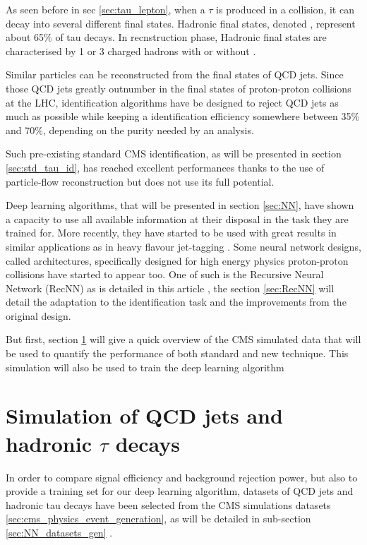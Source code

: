 
As seen before in sec \ref{sec:tau_lepton}, when a $\tau$ is produced in a collision, it can decay into several different final states.
Hadronic final states, denoted \tauh, represent about 65\% of tau decays.
In recnstruction phase, Hadronic final states are characterised by 1 or 3 charged hadrons with or without \pizero .

Similar particles can be reconstructed from the final states of QCD jets.
Since those QCD jets greatly outnumber \tauh in the final states of proton-proton collisions at the LHC, \tauh identification algorithms have be designed to reject QCD jets as much as possible while keeping a \tauh identification efficiency somewhere between 35\% and 70\%, depending on the purity needed by an analysis.

Such pre-existing standard CMS identification, as will be presented in section \ref{sec:std_tau_id}, has reached excellent performances thanks to the use of particle-flow reconstruction but does not use its full potential.

Deep learning algorithms, that will be presented in section \ref{sec:NN}, have shown a capacity to use all available information at their disposal in the task they are trained for. More recently, they have started to be used with great results in similar applications as in heavy flavour jet-tagging \cite{btagging_NN}. Some neural network designs, called architectures, specifically designed for high energy physics proton-proton collisions have started to appear too. One of such is the Recursive Neural Network (RecNN) as is detailed in this article \cite{qcd_aware_RecNN}, the section \ref{sec:RecNN} will detail the adaptation to the \tauh identification task and the improvements from the original design.

But first, section \ref{sec:NN_datasets} will give a quick overview of the CMS simulated data that will be used to quantify the performance of both standard and new technique. This simulation will also be used to train the deep learning algorithm

\section{Simulation of QCD jets and hadronic $\tau$ decays}
\label{sec:NN_datasets}

In order to compare signal efficiency and background rejection power, but also to provide a training set for our deep learning algorithm, datasets of QCD jets and hadronic tau decays have been selected from the CMS simulations datasets \ref{sec:cms_physics_event_generation}, as will be detailed in sub-section \ref{sec:NN_datasets_gen} .

